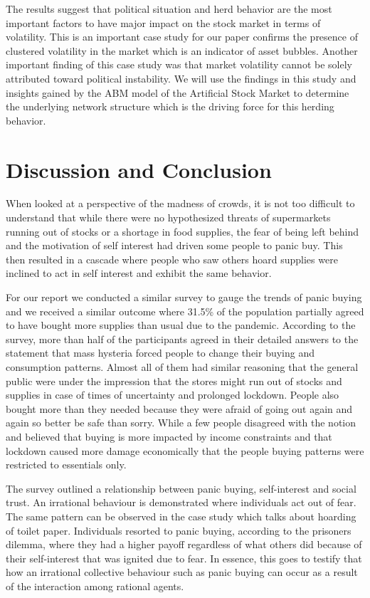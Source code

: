 \documentclass[runningheads]{llncs}
\begin{document}
The results suggest that political situation and herd behavior are the most important factors to have major impact on the stock market in terms of volatility. This is an important case study for our paper confirms the presence of clustered volatility in the market which is an indicator of asset bubbles. Another important finding of this case study was that market volatility cannot be solely attributed toward political instability. We will use the findings in this study and insights gained by the ABM model of the Artificial Stock Market to determine the underlying network structure which is the driving force for this herding behavior.
\section{Discussion and Conclusion}

When looked at a perspective of the madness of crowds, it is not too difficult to understand that while there were no hypothesized threats of supermarkets running out of stocks or a shortage in food supplies, the fear of being left behind and the motivation of self interest had driven some people to panic buy. This then resulted in a cascade where people who saw others hoard supplies were inclined to act in self interest and exhibit the same behavior.

For our report we conducted a similar survey to gauge the trends of panic buying and we received a similar outcome where 31.5\% of the population partially agreed to have bought more supplies than usual due to the pandemic. According to the survey, more than half of the participants agreed in their detailed answers to the statement that mass hysteria forced people to change their buying and consumption patterns. Almost all of them had similar reasoning that the general public were under the impression that the stores might run out of stocks and supplies in case of times of uncertainty and prolonged lockdown. People also bought more than they needed because they were afraid of going out again and again so better be safe than sorry. While a few people disagreed with the notion and believed that buying is more impacted by income constraints and that lockdown caused more damage economically that the people buying patterns were restricted to essentials only.

The survey outlined a relationship between panic buying,  self-interest and social trust. An irrational behaviour is demonstrated where individuals act out of fear. The same pattern can be observed in the case study which talks about hoarding of toilet paper. Individuals resorted to panic buying, according to the prisoners dilemma, where they had a higher payoff regardless of what others did because of their self-interest that was ignited due to fear. In essence, this goes to testify that how an irrational collective behaviour such as panic buying can occur as a result of the interaction among rational agents. 
\end{document}
